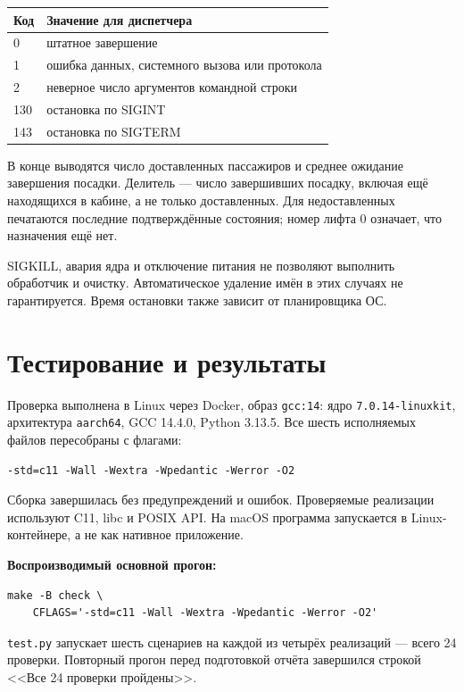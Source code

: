 \documentclass[12pt,a4paper]{article}
\begin{document}
\begin{center}
\begin{tabular}{@{}p{21mm}p{133mm}@{}}
\textbf{Код} & \textbf{Значение для диспетчера} \\
\hline
0 & штатное завершение \\
1 & ошибка данных, системного вызова или протокола \\
2 & неверное число аргументов командной строки \\
130 & остановка по SIGINT \\
143 & остановка по SIGTERM \\
\hline
\end{tabular}
\end{center}

В конце выводятся число доставленных пассажиров и среднее ожидание
завершения посадки. Делитель --- число завершивших посадку, включая
ещё находящихся в кабине, а не только доставленных. Для недоставленных
печатаются последние подтверждённые состояния; номер лифта 0 означает,
что назначения ещё нет.

SIGKILL, авария ядра и отключение питания не позволяют выполнить
обработчик и очистку. Автоматическое удаление имён в этих случаях
не гарантируется. Время остановки также зависит от планировщика ОС.

\section{Тестирование и результаты}

Проверка выполнена в Linux через Docker, образ \verb|gcc:14|:
ядро \verb|7.0.14-linuxkit|, архитектура \verb|aarch64|,
GCC 14.4.0, Python 3.13.5. Все шесть исполняемых файлов пересобраны
с флагами:
\begin{verbatim}
-std=c11 -Wall -Wextra -Wpedantic -Werror -O2
\end{verbatim}
Сборка завершилась без предупреждений и ошибок. Проверяемые реализации
используют C11, libc и POSIX API. На macOS программа запускается
в Linux-контейнере, а не как нативное приложение.

\textbf{Воспроизводимый основной прогон:}
\begin{verbatim}
make -B check \
    CFLAGS='-std=c11 -Wall -Wextra -Wpedantic -Werror -O2'
\end{verbatim}
\verb|test.py| запускает шесть сценариев на каждой из четырёх
реализаций --- всего 24 проверки. Повторный прогон перед подготовкой
отчёта завершился строкой <<Все 24 проверки пройдены>>.
\end{document}
